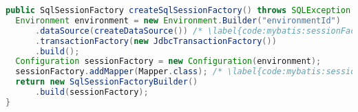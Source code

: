 
\begin{lstlisting}[language=Java, caption={Example of loading data using Java Configuration class}, label={code:mybatis:sessionFactory:java}]
public SqlSessionFactory createSqlSessionFactory() throws SQLException {
  Environment environment = new Environment.Builder("environmentId")
      .dataSource(createDataSource()) /* \label{code:mybatis:sessionFactory:java:dataSource} */
      .transactionFactory(new JdbcTransactionFactory())
      .build();
  Configuration sessionFactory = new Configuration(environment);
  sessionFactory.addMapper(Mapper.class); /* \label{code:mybatis:sessionFactory:java:addMapper} */
  return new SqlSessionFactoryBuilder()
      .build(sessionFactory);
}
\end{lstlisting}
